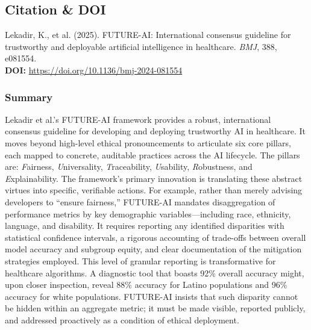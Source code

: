 \documentclass[11pt,twoside]{article}
\begin{document}
\vspace{-0.3cm}
\subsection*{Citation \& DOI}

\vspace{-0.3cm}
Lekadir, K., et al. (2025). FUTURE-AI: International consensus guideline for trustworthy and deployable artificial intelligence in healthcare. \textit{BMJ}, 388, e081554. \\
\textbf{DOI:} \href{https://doi.org/10.1136/bmj-2024-081554}{https://doi.org/10.1136/bmj-2024-081554}

\vspace{-0.3cm}
\subsubsection*{Summary}

\vspace{-0.3cm}
Lekadir et al.’s FUTURE-AI framework provides a robust, international consensus guideline for developing and deploying trustworthy AI in healthcare. It moves beyond high-level ethical pronouncements to articulate six core pillars, each mapped to concrete, auditable practices across the AI lifecycle. The pillars are: \textit{F}airness, \textit{U}niversality, \textit{T}raceability, \textit{U}sability, \textit{R}obustness, and \textit{E}xplainability. The framework’s primary innovation is translating these abstract virtues into specific, verifiable actions. For example, rather than merely advising developers to “ensure fairness,” FUTURE-AI mandates disaggregation of performance metrics by key demographic variables—including race, ethnicity, language, and disability. It requires reporting any identified disparities with statistical confidence intervals, a rigorous accounting of trade-offs between overall model accuracy and subgroup equity, and clear documentation of the mitigation strategies employed. This level of granular reporting is transformative for healthcare algorithms. A diagnostic tool that boasts 92\% overall accuracy might, upon closer inspection, reveal 88\% accuracy for Latino populations and 96\% accuracy for white populations. FUTURE-AI insists that such disparity cannot be hidden within an aggregate metric; it must be made visible, reported publicly, and addressed proactively as a condition of ethical deployment.
\end{document}
